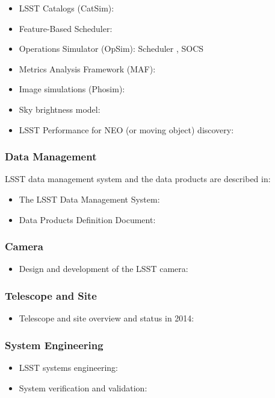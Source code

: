 \begin{itemize}
\item LSST Catalogs (CatSim): \cite{2014SPIE.9150E..14C}
\item Feature-Based Scheduler: \cite{2018arXiv181004815N}
\item Operations Simulator (OpSim): Scheduler \cite{2016SPIE.9910E..13D}, SOCS \cite{2016SPIE.9911E..25R}
\item Metrics Analysis Framework (MAF): \cite{2014SPIE.9149E..0BJ}
\item Image simulations (Phosim): \cite{2015ApJS..218...14P}
\item Sky brightness model: \cite{2016SPIE.9910E..1AY}
\item LSST Performance for NEO (or moving object) discovery: \cite{2018Icar..303..181J}
\end{itemize}


\subsubsection{Data Management}

LSST data management system and the data products are described in:

\begin{itemize}
  \item The LSST Data Management System: \cite{2015arXiv151207914J}
  \item Data Products Definition Document: \cite{LSE-163}
\end{itemize}


\subsubsection{Camera}

\begin{itemize}
   \item Design and development of the LSST camera: \cite{2010SPIE.7735E..0JK}
\end{itemize}


\subsubsection{Telescope and Site}

\begin{itemize}
   \item Telescope and site overview and status in 2014:  \cite{2014SPIE.9145E..1AG}
\end{itemize}

\subsubsection{System Engineering}

\begin{itemize}
   \item LSST systems engineering: \cite{2014SPIE.9150E..0MC}
   \item System verification and validation: \cite{2014SPIE.9150E..0NS}
\end{itemize}
%


